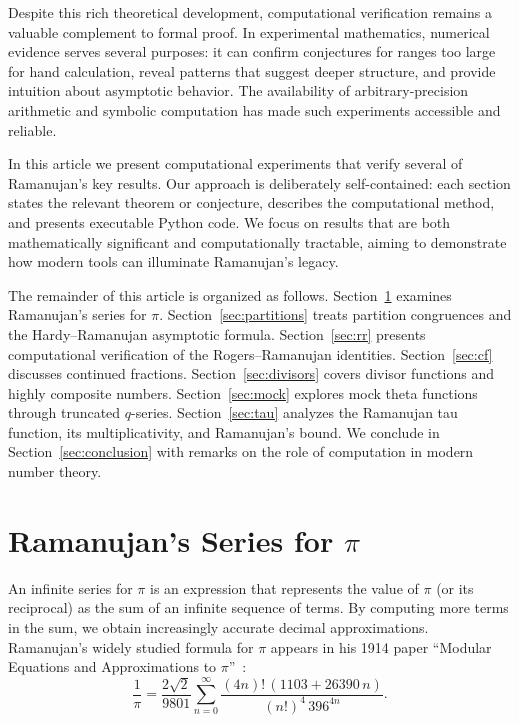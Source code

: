 \documentclass[10pt]{amsart}
\theoremstyle{plain}
\theoremstyle{definition}
\theoremstyle{remark}
\begin{document}
Despite this rich theoretical development, computational verification
remains a valuable complement to formal proof. In experimental
mathematics, numerical evidence serves several purposes: it can
confirm conjectures for ranges too large for hand calculation, reveal
patterns that suggest deeper structure, and provide intuition about
asymptotic behavior. The availability of arbitrary-precision arithmetic
and symbolic computation has made such experiments accessible and
reliable.

In this article we present computational experiments that verify
several of Ramanujan's key results. Our approach is deliberately
self-contained: each section states the relevant theorem or
conjecture, describes the computational method, and presents
executable Python code. We focus on results that are both mathematically
significant and computationally tractable, aiming to demonstrate how
modern tools can illuminate Ramanujan's legacy.

The remainder of this article is organized as follows.
Section~\ref{sec:pi} examines Ramanujan's series for $\pi$.
Section~\ref{sec:partitions} treats partition congruences and the
Hardy--Ramanujan asymptotic formula. Section~\ref{sec:rr} presents
computational verification of the Rogers--Ramanujan identities.
Section~\ref{sec:cf} discusses continued fractions.
Section~\ref{sec:divisors} covers divisor functions and highly composite
numbers. Section~\ref{sec:mock} explores mock theta functions through
truncated $q$-series. Section~\ref{sec:tau} analyzes the Ramanujan tau
function, its multiplicativity, and Ramanujan's bound. We conclude in
Section~\ref{sec:conclusion} with remarks on the role of computation in
modern number theory.

\section{Ramanujan's Series for $\pi$}
\label{sec:pi}

An infinite series for $\pi$ is an expression that represents the value of $\pi$ (or its reciprocal) as the sum of an infinite sequence of terms. By computing more terms in the sum, we obtain increasingly accurate decimal approximations. Ramanujan's widely studied formula for $\pi$ appears in his 1914 paper
``Modular Equations and Approximations to $\pi$''~\cite{ramanujan_1914}:
\begin{equation}
\label{eq:ramanujan_pi}
\frac{1}{\pi}
=
\frac{2\sqrt{2}}{9801}
\sum_{n=0}^{\infty}
\frac{(4n)!\,(1103 + 26390\,n)}{(n!)^4\, 396^{4n}}.
\end{equation}
\end{document}
